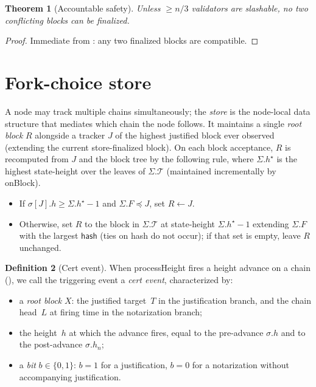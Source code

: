 \ifx\litemode\undefined\documentclass{article}\fi
\newcommand{\T}[0]{\ensuremath{\mathcal{T}}}
\newcommand{\hash}{\mathsf{hash}}
\newcommand{\processHeight}{\textsf{processHeight}\xspace}
\newcommand{\onBlock}{\textsf{onBlock}\xspace}
\theoremstyle{plain}
\newtheorem{theorem}{Theorem}
\theoremstyle{definition}
\newtheorem{definition}[theorem]{Definition}
\theoremstyle{remark}
\begin{document}
\begin{theorem}[Accountable safety]\label{thm:safety}
Unless $\geq n/3$ validators are slashable, no two conflicting blocks can be finalized.
\end{theorem}

\begin{proof}
Immediate from : any two finalized blocks are compatible.
\end{proof}

\section{Fork-choice store}\label{sec:store}

A node may track multiple chains simultaneously; the \emph{store} is the node-local data structure that mediates which chain the node follows.
It maintains a single \emph{root block} $R$ alongside a tracker $J$ of the highest justified block ever observed (extending the current store-finalized block).
On each block acceptance, $R$ is recomputed from $J$ and the block tree by the following rule, where $\Sigma.h^\star$ is the highest state-height over the leaves of $\Sigma.\T$ (maintained incrementally by \onBlock).
\begin{itemize}
  \item If $\sigma[J].h \geq \Sigma.h^\star - 1$ and $\Sigma.F \preceq J$, set $R \gets J$.
  \item Otherwise, set $R$ to the block in $\Sigma.\T$ at state-height $\Sigma.h^\star - 1$ extending $\Sigma.F$ with the largest $\hash$ (ties on hash do not occur); if that set is empty, leave $R$ unchanged.
\end{itemize}

\begin{definition}[Cert event]\label{def:cert-event}
When \processHeight fires a height advance on a chain (), we call the triggering event a \emph{cert event}, characterized by:
\begin{itemize}
  \item a \emph{root block} $X$: the justified target~$T$ in the justification branch, and the chain head~$L$ at firing time in the notarization branch;
  \item the height~$h$ at which the advance fires, equal to the pre-advance $\sigma.h$ and to the post-advance $\sigma.h_n$;
  \item a \emph{bit} $b \in \{0, 1\}$: $b = 1$ for a justification, $b = 0$ for a notarization without accompanying justification.
\end{itemize}
\end{definition}
\end{document}
